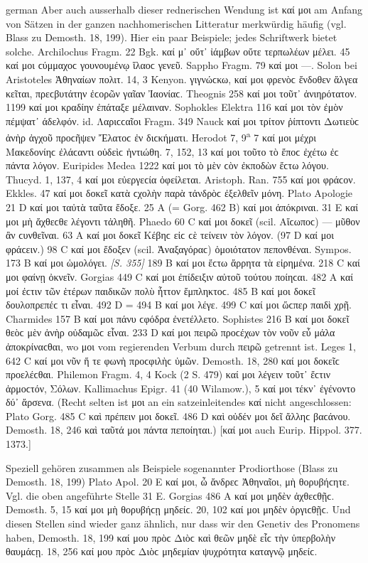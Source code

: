 \begin{otherlanguage*}{german}
Aber auch ausserhalb dieser rednerischen Wendung ist καί μοι am Anfang von Sätzen in der ganzen nachhomerischen Litteratur merkwürdig häufig (vgl. Blass zu Demosth. 18, 199). Hier ein paar Beispiele; jedes Schriftwerk bietet solche. Archilochus Fragm. 22 Bgk. καί μ᾽ οὔτ᾽ ἰάμβων οὔτε τερπωλέων μέλει. 45 καί μοι ϲύμμαχοϲ γουνουμένῳ ἵλαοϲ γενεῦ. Sappho Fragm. 79 καί μοι —. Solon bei Aristoteles Ἀθηναίων πολιτ. 14, 3 Kenyon. γιγνώϲκω, καί μοι φρενὸϲ ἔνδοθεν ἄλγεα κεῖται, πρεϲβυτάτην ἐϲορῶν γαῖαν Ἰαονίαϲ. Theognis 258 καί μοι τοῦτ᾽ ἀνιηρότατον. 1199 καί μοι κραδίην ἐπάταξε μέλαιναν. Sophokles Elektra 116 καί μοι τὸν ἐμὸν πέμψατ᾽ άδελφόν. id. Λαριϲϲαῖοι Fragm. 349 Nauck καί μοι τρίτον ῥίπτοντι Δωτιεὺϲ ἀνὴρ ἀγχοῦ προϲῆψεν Ἔλατοϲ ἐν διϲκήματι. Herodot 7, 9\textsuperscript{a} 7 καί μοι μέχρι Μακεδονίηϲ ἐλάϲαντι οὐδεὶϲ ἠντιώθη. 7, 152, 13 καί μοι τοῦτο τὸ ἔποϲ ἐχέτω ἐϲ πάντα λόγον. Euripides Medea 1222 καί μοι τὸ μὲν ϲὸν ἐκποδὼν ἔϲτω λόγου. Thucyd. 1, 137, 4 καί μοι εὐεργεϲία ὀφείλεται. Aristoph. Ran. 755 καί μοι φράϲον. Ekkles. 47 καί μοι δοκεῖ κατὰ ϲχολὴν παρὰ τἀνδρὸϲ ἐξελθεῖν μόνη. Plato Apologie 21 D καί μοι ταὐτὰ ταῦτα ἔδοξε. 25 Α (= Gorg. 462 Β) καί μοι ἀπόκριναι. 31 E καί μοι μὴ ἄχθεϲθε λέγοντι τἀληθῆ. Phaedo 60 C καί μοι δοκεῖ (scil. Αἴϲωποϲ) — μῦθον ἂν ϲυνθεῖναι. 63 Α καί μοι δοκεῖ Κέβηϲ εἰϲ ϲὲ τείνειν τὸν λόγον. (97 D καί μοι φράϲειν.) 98 C καί μοι ἔδοξεν (scil. Ἀναξαγόραϲ) ὁμοιότατον πεπονθέναι. Sympos. 173 Β καί μοι ὡμολόγει. \hypertarget{p355}{\emph{[S. 355]}}\label{p355} 189 B καί μοι ἔϲτω ἄρρητα τὰ εἰρημένα. 218 C καί μοι φαίνῃ ὀκνεῖν. Gorgias 449 C καί μοι ἐπίδειξιν αὐτοῦ τούτου ποίηϲαι. 482 Α καί μοί ἐϲτιν τῶν ἑτέρων παιδικῶν πολὺ ἧττον ἔμπληκτοϲ. 485 Β καί μοι δοκεῖ δουλοπρεπέϲ τι εἶναι. 492 D = 494 Β καί μοι λέγε. 499 C καί μοι ὥϲπερ παιδὶ χρῇ. Charmides 157 Β καί μοι πάνυ ϲφόδρα ἐνετέλλετο. Sophistes 216 Β καί μοι δοκεῖ θεὸϲ μὲν ἁνὴρ οὐδαμῶϲ εἶναι. 233 D καί μοι πειρῶ προϲέχων τὸν νοῦν εὖ μάλα ἀποκρίναϲθαι, wo μοι vom regierenden Verbum durch πειρῶ getrennt ist. Leges 1, 642 C καί μοι νῦν ἥ τε φωνὴ προϲφιλὴϲ ὑμῶν. Demosth. 18, 280 καί μοι δοκεῖϲ προελέϲθαι. Philemon Fragm. 4, 4 Kock (2 S. 479) καί μοι λέγειν τοῦτ᾽ ἔϲτιν ἁρμοϲτόν, Σόλων. Kallimachus Epigr. 41 (40 Wilamow.), 5 καί μοι τέκν᾽ ἐγένοντο δύ᾽ ἄρσενα. (Recht selten ist μοι an ein satzeinleitendes καί nicht angeschlossen: Plato Gorg. 485 C καὶ πρέπειν μοι δοκεῖ. 486 D καὶ οὐδέν μοι δεῖ ἄλληϲ βαϲάνου. Demosth. 18, 246 καὶ ταῦτά μοι πάντα πεποίηται.) [καί μοι auch Eurip. Hippol. 377. 1373.]

Speziell gehören zusammen als Beispiele sogenannter Prodiorthose (Blass zu Demosth. 18, 199) Plato Apol. 20 E καί μοι, ὦ ἄνδρεϲ Ἀθηναῖοι, μὴ θορυβήϲητε. Vgl. die oben angeführte Stelle 31 E. Gorgias 486 A καί μοι μηδὲν ἀχθεϲθῇϲ. Demosth. 5, 15 καί μοι μὴ θορυβήϲῃ μηδείϲ. 20, 102 καί μοι μηδὲν ὀργιϲθῇϲ. Und diesen Stellen sind wieder ganz ähnlich, nur dass wir den Genetiv des Pronomens haben, Demosth. 18, 199 καί μου πρὸϲ Διὸϲ καὶ θεῶν μηδὲ εἷϲ τὴν ὑπερβολὴν θαυμάϲῃ. 18, 256 καί μου πρὸϲ Διὸϲ μηδεμίαν ψυχρότητα καταγνῷ μηδείϲ.


\end{otherlanguage*}
